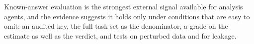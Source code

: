 Known-answer evaluation is the strongest external signal available for analysis agents, and the evidence suggests it holds only under conditions that are easy to omit: an audited key, the full task set as the denominator, a grade on the estimate as well as the verdict, and tests on perturbed data and for leakage.
